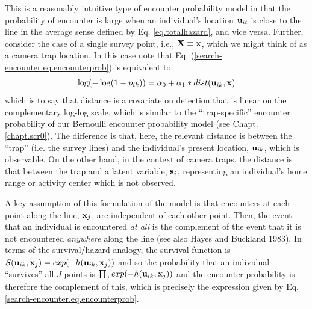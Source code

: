 This is a reasonably intuitive type of encounter probability model in
that the probability of encounter is large when an individual's
location ${\bf u}_{it}$ is close to the line in the average sense
defined by Eq. \ref{eq.totalhazard}, and vice versa.
Further, consider the case of a single survey point, i.e., ${\bf X} \equiv {\bf
  x}$, which we might think of as a camera trap location.  In this
case note that Eq. (\ref{search-encounter.eq.encounterprob}) is equivalent to
\[
\log(-\log(1-p_{ik})) = \alpha_{0} + \alpha_{1}*dist( {\bf u}_{ik},{\bf x})
\]
which is to say that distance is a covariate on detection that is
linear on the complementary log-log scale, which is similar to the
``trap-specific'' encounter probability of our Bernoulli encounter
probability model (see Chapt. \ref{chapt.scr0}).
The difference is that, here, the relevant distance
is between the ``trap'' (i.e. the survey lines) and the individual's
present location, ${\bf u}_{ik}$, which is observable. On the other
hand, in the context of camera traps, the distance is that between the
trap and a latent variable, ${\bf s}_{i}$, representing an
individual's home range or activity center which is not observed.


A key assumption of this formulation of the model is that 
encounters at each point along the line, ${\bf x}_{j}$, are
independent of each other point. Then, the event that an individual is
encountered {\it at all} is the complement of the event that it is not
encountered {\it anywhere} along the line (see also Hayes and Buckland
1983).  In terms of the survival/hazard analogy, 
the survival function
is $S({\bf u}_{ik},{\bf x}_{j}) = exp(-h({\bf u}_{ik},{\bf x}_{j}))$
and so the probability that an individual ``survives'' all $J$ points
is $\prod_{j} exp(-h({\bf u}_{ik},{\bf x}_{j}))$ and the encounter
probability is therefore the complement of this, which is precisely
the expression given by Eq. \ref{search-encounter.eq.encounterprob}.


